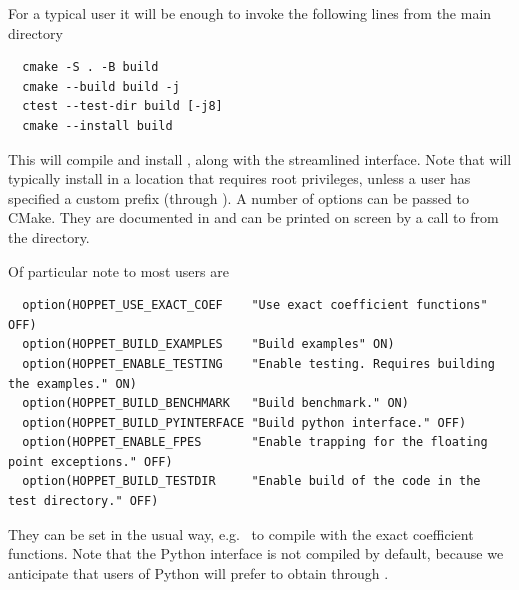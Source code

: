 For a typical user it will be enough to invoke the following lines
from the main directory 
\begin{lstlisting}
  cmake -S . -B build
  cmake --build build -j
  ctest --test-dir build [-j8]
  cmake --install build
\end{lstlisting}
% 
% 
This will compile and install \hoppet, along with the streamlined interface.
%
Note that  will typically
install in a location that requires root privileges, unless a user has
specified a custom prefix (through
). A number of options can
be passed to CMake. They are documented in
 and can be printed on screen
by a call to  from the  directory.

Of particular note to most users are 
\begin{lstlisting}
  option(HOPPET_USE_EXACT_COEF    "Use exact coefficient functions"  OFF)
  option(HOPPET_BUILD_EXAMPLES    "Build examples" ON)
  option(HOPPET_ENABLE_TESTING    "Enable testing. Requires building the examples." ON)
  option(HOPPET_BUILD_BENCHMARK   "Build benchmark." ON)
  option(HOPPET_BUILD_PYINTERFACE "Build python interface." OFF)
  option(HOPPET_ENABLE_FPES       "Enable trapping for the floating point exceptions." OFF)
  option(HOPPET_BUILD_TESTDIR     "Enable build of the code in the test directory." OFF)
\end{lstlisting}
They can be set in the usual  way, e.g.\  to compile \hoppet with the exact
coefficient functions.
%
Note that the Python interface is not compiled by default, because we
anticipate that users of Python will prefer to obtain \hoppet through
\ttt{pip install hoppet}.

